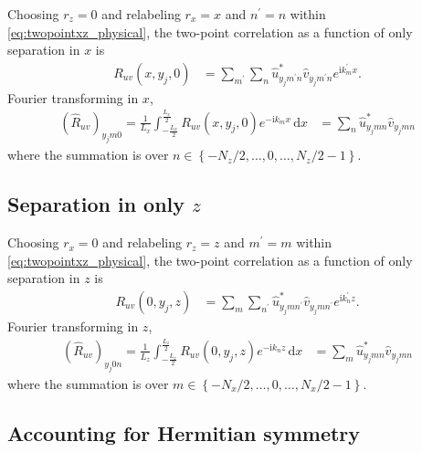 \documentclass[letterpaper,11pt,nointlimits,reqno]{amsart}
\newcommand{\ii}{\ensuremath{\mathrm{i}}}
\begin{document}
Choosing $r_z = 0$ and relabeling $r_x = x$ and $n^\prime = n$ within
\eqref{eq:twopointxz_physical}, the two-point correlation as a
function of only separation in $x$ is
\begin{align}
R_{uv} \left( x, y_j, 0 \right)
  &= \sum_{m^\prime}
     \sum_{n}
     \hat{u}^\ast_{y_j m^\prime n}
     \hat{v}_{y_j m^\prime n}
     e^{\ii k_m^\prime x}.
    \label{eq:twopointx_physical}
\end{align}
Fourier transforming in $x$,
\begin{align}
\left(\hat{R}_{uv}\right)_{y_j m 0}
   =
    \frac{1}{L_x}
    \int_{-\frac{L_x}{2}}^{\frac{L_x}{2}}
    R_{uv} \left( x, y_j, 0 \right)
    e^{-\ii k_m x}
    \,\mathrm{d}x
  &=
    \sum_{n}
    \hat{u}^\ast_{y_j m n}
    \hat{v}_{y_j m n}
    \label{eq:twopointx_wave}
\end{align}
where the summation is over $n \in \left\{-N_z/2, \dots, 0, \dots,
N_z/2-1\right\}$.

\subsection{Separation in only $z$}

Choosing $r_x = 0$ and relabeling $r_z = z$ and $m^\prime = m$ within
\eqref{eq:twopointxz_physical}, the two-point correlation as a
function of only separation in $z$ is
\begin{align}
R_{uv} \left( 0, y_j, z \right)
  &= \sum_{m}
     \sum_{n^\prime}
     \hat{u}^\ast_{y_j m n^\prime}
     \hat{v}_{y_j m n^\prime}
     e^{\ii k_n^\prime z}.
    \label{eq:twopointz_physical}
\end{align}
Fourier transforming in $z$,
\begin{align}
\left(\hat{R}_{uv}\right)_{y_j 0 n}
   =
    \frac{1}{L_z}
    \int_{-\frac{L_z}{2}}^{\frac{L_z}{2}}
    R_{uv} \left( 0, y_j, z \right)
    e^{-\ii k_n z}
    \,\mathrm{d}x
  &=
    \sum_{m}
    \hat{u}^\ast_{y_j m n}
    \hat{v}_{y_j m n}
    \label{eq:twopointz_wave}
\end{align}
where the summation is over $m \in \left\{-N_x/2, \dots, 0, \dots,
N_x/2-1\right\}$.

\subsection{Accounting for Hermitian symmetry}
\end{document}
